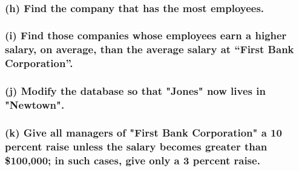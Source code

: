 \documentclass[12pt]{article}
\begin{document}
\newpage

\vspace{5mm} \\

\vspace{1cm}
\subsubsection*{(h) Find the company that has the most employees.}


\vspace{1cm}
\subsubsection*{(i) Find those companies whose employees earn a higher salary, on average, than the average salary at “First Bank Corporation”.}


\newpage

\subsubsection*{(j) Modify the database so that "Jones" now lives in "Newtown".}


\vspace{1cm}
\subsubsection*{(k) Give all managers of "First Bank Corporation" a 10 percent raise unless the salary becomes greater
than \$100,000; in such cases, give only a 3 percent raise.}
\end{document}
